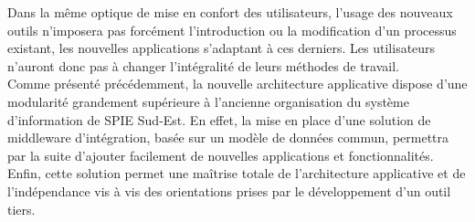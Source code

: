 Dans la même optique de mise en confort des utilisateurs, l’usage des nouveaux outils n’imposera pas forcément l’introduction ou la modification d’un processus existant, les nouvelles applications s’adaptant à ces derniers. Les utilisateurs n’auront donc pas à changer l’intégralité de leurs méthodes de travail. \\

Comme présenté précédemment, la nouvelle architecture applicative dispose d’une modularité grandement supérieure à l’ancienne organisation du système d’information de SPIE Sud-Est. En effet, la mise en place d’une solution de middleware d’intégration, basée sur un modèle de données commun, permettra par la suite d’ajouter facilement de nouvelles applications et fonctionnalités. \\

Enfin, cette solution permet une maîtrise totale de l’architecture applicative et de l’indépendance vis à vis des orientations prises par le développement d’un outil tiers. \\
